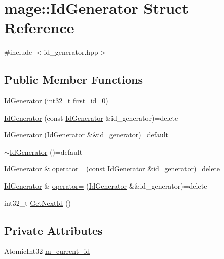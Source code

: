 \hypertarget{structmage_1_1_id_generator}{}\section{mage\+:\+:Id\+Generator Struct Reference}
\label{structmage_1_1_id_generator}


{\ttfamily \#include $<$id\+\_\+generator.\+hpp$>$}

\subsection*{Public Member Functions}
\begin{DoxyCompactItemize}
\item 
\hyperlink{structmage_1_1_id_generator_a10fccba8287b8e7ace574b690a197561}{Id\+Generator} (int32\+\_\+t first\+\_\+id=0)
\item 
\hyperlink{structmage_1_1_id_generator_a6f502d2cd8b63e7c76f31834b028a11d}{Id\+Generator} (const \hyperlink{structmage_1_1_id_generator}{Id\+Generator} \&id\+\_\+generator)=delete
\item 
\hyperlink{structmage_1_1_id_generator_a0ee69053c6cdb9f79a5857e65ebd2b6a}{Id\+Generator} (\hyperlink{structmage_1_1_id_generator}{Id\+Generator} \&\&id\+\_\+generator)=default
\item 
\hyperlink{structmage_1_1_id_generator_a70161ab5b10294ebba1ace7a3b0f8d31}{$\sim$\+Id\+Generator} ()=default
\item 
\hyperlink{structmage_1_1_id_generator}{Id\+Generator} \& \hyperlink{structmage_1_1_id_generator_a370c8289f38a534006e8b9ca7ec78026}{operator=} (const \hyperlink{structmage_1_1_id_generator}{Id\+Generator} \&id\+\_\+generator)=delete
\item 
\hyperlink{structmage_1_1_id_generator}{Id\+Generator} \& \hyperlink{structmage_1_1_id_generator_aace8082947445d26d2421ba8b361f1bc}{operator=} (\hyperlink{structmage_1_1_id_generator}{Id\+Generator} \&\&id\+\_\+generator)=delete
\item 
int32\+\_\+t \hyperlink{structmage_1_1_id_generator_ae1d2373c92c717b1344e78ef71260e37}{Get\+Next\+Id} ()
\end{DoxyCompactItemize}
\subsection*{Private Attributes}
\begin{DoxyCompactItemize}
\item 
Atomic\+Int32 \hyperlink{structmage_1_1_id_generator_ab094c8e57444d4fa02d5f3c2a5ea25f3}{m\+\_\+current\+\_\+id}
\end{DoxyCompactItemize}


